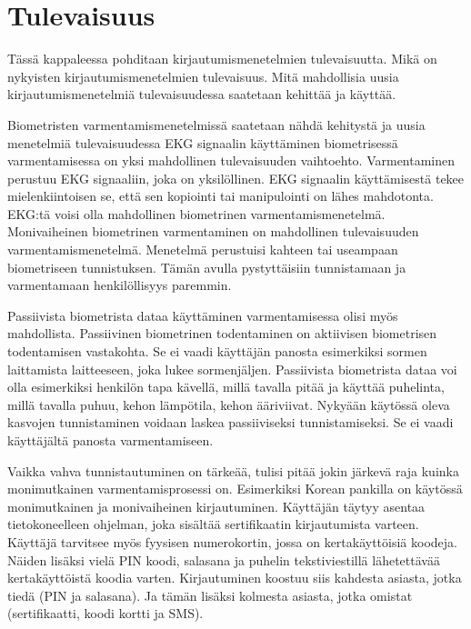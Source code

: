 \chapter{Tulevaisuus\label{tulevaisuus}}

Tässä kappaleessa pohditaan kirjautumismenetelmien tulevaisuutta. Mikä on nykyisten kirjautumismenetelmien tulevaisuus. Mitä mahdollisia uusia kirjautumismenetelmiä tulevaisuudessa saatetaan kehittää ja käyttää.


Biometristen varmentamismenetelmissä saatetaan nähdä kehitystä ja uusia menetelmiä tulevaisuudessa
EKG signaalin käyttäminen biometrisessä varmentamisessa on yksi mahdollinen tulevaisuuden vaihtoehto. Varmentaminen perustuu EKG signaaliin, joka on yksilöllinen. EKG signaalin käyttämisestä tekee mielenkiintoisen se, että sen kopiointi tai manipulointi on lähes mahdotonta. EKG:tä voisi olla mahdollinen biometrinen varmentamismenetelmä. \citep{shdefat2018utilizing}
Monivaiheinen biometrinen varmentaminen on mahdollinen tulevaisuuden varmentamismenetelmä. Menetelmä perustuisi kahteen tai useampaan biometriseen tunnistuksen. Tämän avulla pystyttäisiin tunnistamaan ja varmentamaan henkilöllisyys paremmin. \citep{biometric_authentication_systems}

Passiivista biometrista dataa käyttäminen varmentamisessa olisi myös mahdollista. Passiivinen biometrinen todentaminen on aktiivisen biometrisen todentamisen vastakohta. Se ei vaadi käyttäjän panosta esimerkiksi sormen laittamista laitteeseen, joka lukee sormenjäljen. Passiivista biometrista dataa voi olla esimerkiksi henkilön tapa kävellä, millä tavalla pitää ja käyttää puhelinta, millä tavalla puhuu, kehon lämpötila, kehon ääriviivat. Nykyään käytössä oleva kasvojen tunnistaminen voidaan laskea passiiviseksi tunnistamiseksi. Se ei vaadi käyttäjältä panosta varmentamiseen. \citep{biometric_authentication_systems}\citep{passive_biometrics}

Vaikka vahva tunnistautuminen on tärkeää, tulisi pitää jokin järkevä raja kuinka monimutkainen varmentamisprosessi on. Esimerkiksi Korean pankilla on käytössä monimutkainen ja monivaiheinen kirjautuminen. Käyttäjän täytyy asentaa tietokoneelleen ohjelman, joka sisältää sertifikaatin kirjautumista varteen. Käyttäjä tarvitsee myös fyysisen numerokortin, jossa on kertakäyttöisiä koodeja. Näiden lisäksi vielä PIN koodi, salasana ja puhelin tekstiviestillä lähetettävää kertakäyttöistä koodia varten.
Kirjautuminen koostuu siis kahdesta asiasta, jotka tiedä (PIN ja salasana). Ja tämän lisäksi kolmesta asiasta, jotka omistat (sertifikaatti, koodi kortti ja SMS). \citep{rittenhouse2015survey}
